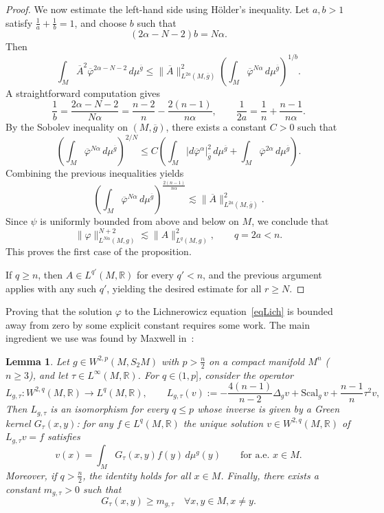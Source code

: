 \documentclass[a4paper, 10pt, reqno]{amsart}
\theoremstyle{plain}
\newtheorem{lemma}[thm]{Lemma}
\theoremstyle{remark}
\theoremstyle{definition}
\renewcommand{\phi}{\varphi}
\newcommand{\bR}{\mathbb{R}}
\newcommand{\gbar}{\overline{g}}
\newcommand{\Abar}{\overline{A}}
\newcommand{\phibar}{\overline{\varphi}}
\newcommand{\scal}{\mathrm{Scal}}
\begin{document}
\begin{proof}
    We now estimate the left-hand side using H\"older's inequality. Let $a,b>1$
    satisfy $\frac{1}{a} + \frac{1}{b} = 1$, and choose $b$ such that
    \[
        (2\alpha - N - 2)b = N\alpha.
    \]
    Then
    \[
        \int_M \Abar^2 \phibar^{2\alpha-N-2}\, d\mu^{\gbar}
        \le
        \|\Abar\|_{L^{2a}(M,\gbar)}^2
        \left(\int_M \phibar^{N\alpha}\, d\mu^{\gbar}\right)^{1/b}.
    \]
    A straightforward computation gives
    \[
        \frac{1}{b}
        = \frac{2\alpha - N - 2}{N\alpha}
        = \frac{n-2}{n} - \frac{2(n-1)}{n\alpha},
        \qquad
        \frac{1}{2a}
        = \frac{1}{n} + \frac{n-1}{n\alpha}.
    \]
    By the Sobolev inequality on $(M,\gbar)$, there exists a constant $C>0$ such
    that
    \[
        \left(\int_M \phibar^{N\alpha}\, d\mu^{\gbar}\right)^{2/N}
        \le
        C \left(
        \int_M |d\phibar^\alpha|_{\gbar}^2\, d\mu^{\gbar}
        + \int_M \phibar^{2\alpha}\, d\mu^{\gbar}
        \right).
    \]
    Combining the previous inequalities yields
    \[
        \left(\int_M \phibar^{N\alpha}\, d\mu^{\gbar}\right)^{\frac{2(n-1)}{n\alpha}}
        \lesssim
        \|\Abar\|_{L^{2a}(M,\gbar)}^2.
    \]
    Since $\psi$ is uniformly bounded from above and below on $M$, we conclude that
    \[
        \|\phi\|_{L^{N\alpha}(M,g)}^{N+2}
        \lesssim
        \|A\|_{L^q(M,g)}^2,
        \qquad q = 2a < n.
    \]
    This proves the first case of the proposition.

    If $q \ge n$, then $A \in L^{q'}(M, \bR)$ for every $q' < n$, and the previous
    argument applies with any such $q'$, yielding the desired estimate for all $r
        \ge N$.
\end{proof}

Proving that the solution $\phi$ to the Lichnerowicz equation~\eqref{eqLich} is
bounded away from zero by some explicit constant requires some work. The main
ingredient we use was found by Maxwell in~\cite{MaxwellNonCMC}:

\begin{lemma}\label{lmGreenLgtau}
    Let $g\in W^{2,p}(M, S_2M)$ with $p > \frac{n}{2}$ on a compact manifold $M^n$ ($n\ge3$), and let
    $\tau\in L^\infty(M, \bR)$. For $q\in(1,p]$, consider the operator
    \[
        L_{g,\tau} : W^{2,q}(M, \bR)\to L^q(M, \bR),\qquad
        L_{g,\tau}(v):= -\frac{4(n-1)}{n-2} \Delta_g v + \scal_g\, v + \frac{n-1}{n}\tau^2 v,
    \]
    Then $L_{g,\tau}$ is an isomorphism for every $q\leq p$ whose inverse is given
    by a Green kernel $G_\tau(x,y)$: for any $f\in L^q(M, \bR)$ the unique solution
    $v\in W^{2,q}(M, \bR)$ of $L_{g,\tau}v=f$ satisfies
    \[
        v(x)=\int_M G_\tau(x,y)f(y)\,d\mu^g(y)\qquad \text{for a.e.\ }x\in M.
    \]
    Moreover, if $q>\frac{n}{2}$, the identity holds for all $x\in M$. Finally,
    there exists a constant $m_{g, \tau} > 0$ such that
    \[
        G_\tau(x,y)\geq m_{g,\tau} \quad \forall x, y \in M, x \neq y.
    \]
\end{lemma}
\end{document}
